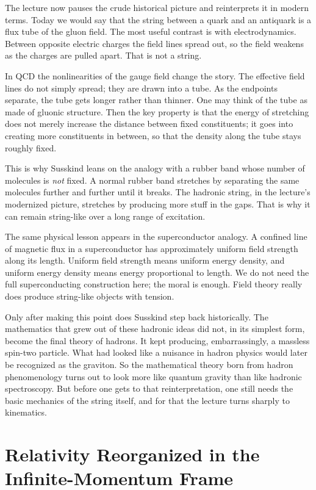 The lecture now pauses the crude historical picture and reinterprets it in modern terms. Today we would say that the string between a quark and an antiquark is a flux tube of the gluon field. The most useful contrast is with electrodynamics. Between opposite electric charges the field lines spread out, so the field weakens as the charges are pulled apart. That is not a string.

In QCD the nonlinearities of the gauge field change the story. The effective field lines do not simply spread; they are drawn into a tube. As the endpoints separate, the tube gets longer rather than thinner. One may think of the tube as made of gluonic structure. Then the key property is that the energy of stretching does not merely increase the distance between fixed constituents; it goes into creating more constituents in between, so that the density along the tube stays roughly fixed.

This is why Susskind leans on the analogy with a rubber band whose number of molecules is \emph{not} fixed. A normal rubber band stretches by separating the same molecules further and further until it breaks. The hadronic string, in the lecture's modernized picture, stretches by producing more stuff in the gaps. That is why it can remain string-like over a long range of excitation.

The same physical lesson appears in the superconductor analogy. A confined line of magnetic flux in a superconductor has approximately uniform field strength along its length. Uniform field strength means uniform energy density, and uniform energy density means energy proportional to length. We do not need the full superconducting construction here; the moral is enough. Field theory really does produce string-like objects with tension.

Only after making this point does Susskind step back historically. The mathematics that grew out of these hadronic ideas did not, in its simplest form, become the final theory of hadrons. It kept producing, embarrassingly, a massless spin-two particle. What had looked like a nuisance in hadron physics would later be recognized as the graviton. So the mathematical theory born from hadron phenomenology turns out to look more like quantum gravity than like hadronic spectroscopy. But before one gets to that reinterpretation, one still needs the basic mechanics of the string itself, and for that the lecture turns sharply to kinematics.

\section{Relativity Reorganized in the Infinite-Momentum Frame}

